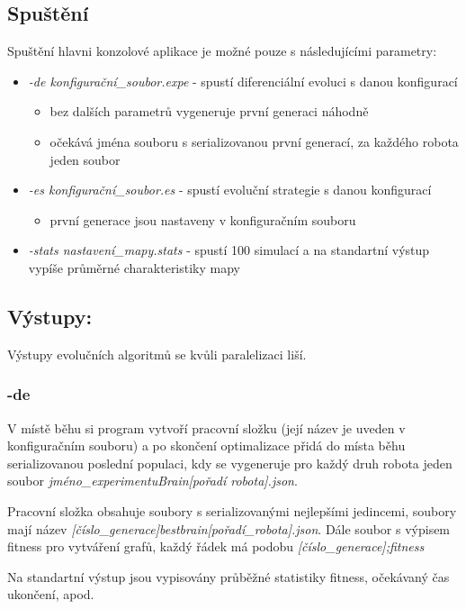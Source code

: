 \documentclass[12pt, oneside]{article}
\begin{document}
\subsection{Spuštění}
Spuštění hlavni konzolové aplikace je možné pouze s následujícími parametry: \par
\begin{itemize}
\item \textit{-de konfigurační\_soubor.expe} - spustí diferenciální evoluci s danou konfigurací \begin{itemize}
	\item bez dalších parametrů vygeneruje první generaci náhodně
	\item očekává jména souboru s serializovanou první generací, za každého robota jeden soubor 
	\end{itemize}
\item \textit{-es konfigurační\_soubor.es} - spustí evoluční strategie s danou konfigurací 
\begin{itemize}
	\item první generace jsou nastaveny v konfiguračním souboru
\end{itemize}
\item \textit{-stats nastavení\_mapy.stats} - spustí 100 simulací a na standartní výstup vypíše průměrné charakteristiky mapy  
\end{itemize} 
\subsection{Výstupy:}
Výstupy evolučních algoritmů se kvůli paralelizaci liší.
\subsubsection*{-de}
V místě běhu si program vytvoří pracovní složku (její název je uveden v konfiguračním souboru) a po skončení optimalizace přidá do místa běhu serializovanou poslední populaci, kdy se vygeneruje pro každý druh robota jeden soubor \textit{jméno\_experimentuBrain[pořadí robota].json}. 
\par 
Pracovní složka obsahuje soubory s serializovanými nejlepšími jedincemi, soubory mají název \textit{[číslo\_generace]bestbrain[pořadí\_robota].json}. Dále soubor s výpisem fitness pro vytváření grafů, každý řádek má podobu \textit{[číslo\_generace];fitness}
\par 
Na standartní výstup jsou vypisovány průběžné statistiky fitness, očekávaný čas ukončení, apod.
\end{document}
